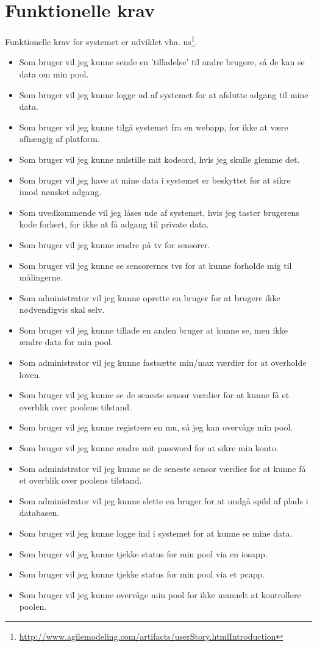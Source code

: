 \section{Funktionelle krav}
Funktionelle krav for systemet er udviklet vha. \gls{us}\footnote{\url{http://www.agilemodeling.com/artifacts/userStory.htmlIntroduction}}.

\begin{itemize}
	\item Som bruger vil jeg kunne sende en ’tilladelse’ til andre brugere, så de kan se data om min pool.
	\item Som bruger vil jeg kunne logge ud af systemet for at afslutte adgang til mine data.
	\item Som bruger vil jeg kunne tilgå systemet fra en \gls{webapp}, for ikke at være afhængig af platform.
	\item Som bruger vil jeg kunne nulstille mit kodeord, hvis jeg skulle glemme det.
	\item Som bruger vil jeg have at mine data i systemet er beskyttet for at sikre imod uønsket adgang.
	\item Som uvedkommende vil jeg låses ude af systemet, hvis jeg taster brugerens kode forkert, for ikke at få adgang til private data.
	\item Som bruger vil jeg kunne ændre på \gls{tv} for sensorer.
	\item Som bruger vil jeg kunne se sensorernes \glspl{tv} for at kunne forholde mig til målingerne.
	\item Som administrator vil jeg kunne oprette en bruger for at brugere ikke nødvendigvis skal selv.
	\item Som bruger vil jeg kunne tillade en anden bruger at kunne se, men ikke ændre data for min pool.
	\item Som administrator vil jeg kunne fastsætte min/max værdier for at overholde loven.
	\item Som bruger vil jeg kunne se de seneste sensor værdier for at kunne få et overblik over poolens tilstand.
	\item Som bruger vil jeg kunne registrere en \gls{mu}, så jeg kan overvåge min pool.
	\item Som bruger vil jeg kunne ændre mit password for at sikre min konto.
	\item Som administrator vil jeg kunne se de seneste sensor værdier for at kunne få et overblik over poolens tilstand.
	\item Som administrator vil jeg kunne slette en bruger for at undgå spild af plads i databasen.
	\item Som bruger vil jeg kunne logge ind i systemet for at kunne se mine data.
	\item Som bruger vil jeg kunne tjekke status for min pool via en \gls{iosapp}.
	\item Som bruger vil jeg kunne tjekke status for min pool via et \gls{pcapp}.
	\item Som bruger vil jeg kunne overvåge min pool for ikke manuelt at kontrollere poolen.
\end{itemize}
